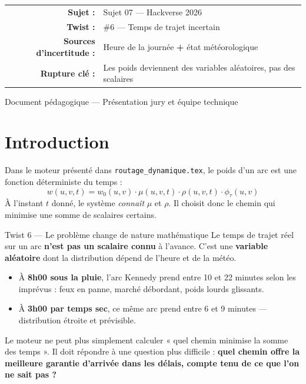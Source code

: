 \documentclass[12pt,a4paper]{article}
\theoremstyle{definition}
\theoremstyle{remark}
\begin{document}
\begin{titlepage}
  \begin{tabular}{rl}
    \textbf{Sujet :}       & Sujet 07 — Hackverse 2026 \\
    \textbf{Twist :}       & \#6 — Temps de trajet incertain \\
    \textbf{Sources d'incertitude :} &
      Heure de la journée \textbf{+} état météorologique \\
    \textbf{Rupture clé :} &
      Les poids deviennent des variables aléatoires, pas des scalaires \\
  \end{tabular}

  \vfill
  {\small\color{gray} Document pédagogique — Présentation jury et équipe technique}
\end{titlepage}

\tableofcontents
\newpage

\section*{Introduction}

Dans le moteur présenté dans \texttt{routage\_dynamique.tex}, le poids
d'un arc est une fonction déterministe du temps :
\[
  w(u,v,t) = w_0(u,v) \cdot \mu(u,v,t) \cdot \rho(u,v,t) \cdot \phi_\tau(u,v)
\]
À l'instant $t$ donné, le système \emph{connaît} $\mu$ et $\rho$.
Il choisit donc le chemin qui minimise une somme de scalaires certains.

\begin{twistbox}{Twist 6 — Le problème change de nature mathématique}
Le temps de trajet réel sur un arc \textbf{n'est pas un scalaire connu}
à l'avance. C'est une \textbf{variable aléatoire} dont la distribution
dépend de l'heure et de la météo.

\medskip
\begin{itemize}[leftmargin=1.5em]
  \item À \textbf{8h00 sous la pluie}, l'arc Kennedy prend entre 10 et
    22 minutes selon les imprévus : feux en panne, marché débordant, poids
    lourds glissants.
  \item À \textbf{3h00 par temps sec}, ce même arc prend entre 6 et
    9 minutes — distribution étroite et prévisible.
\end{itemize}

\medskip
Le moteur ne peut plus simplement calculer « quel chemin minimise la
somme des temps ». Il doit répondre à une question plus difficile :
\textbf{quel chemin offre la meilleure garantie d'arrivée dans les délais,
compte tenu de ce que l'on ne sait pas ?}
\end{twistbox}
\end{document}
